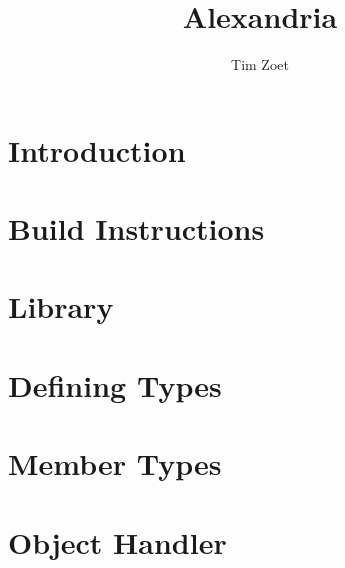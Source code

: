 \documentclass[twoside,a4paper,smallborder=true]{refart}
\title{Alexandria}
\author{Tim Zoet}
\date{}
\begin{document}
\maketitle

\tableofcontents
\newpage

\section{Introduction}
\label{section:introduction}

\newpage

\section{Build Instructions}
\label{section:build}

\newpage

\section{Library}
\label{section:library}

\newpage

\section{Defining Types}
\label{section:types}

\newpage

\section{Member Types}
\label{section:member_types}

\newpage

\section{Object Handler}
\label{section:object_handler}

\newpage

\printglossaries
\newpage

 
 
\printindex
\end{document}
